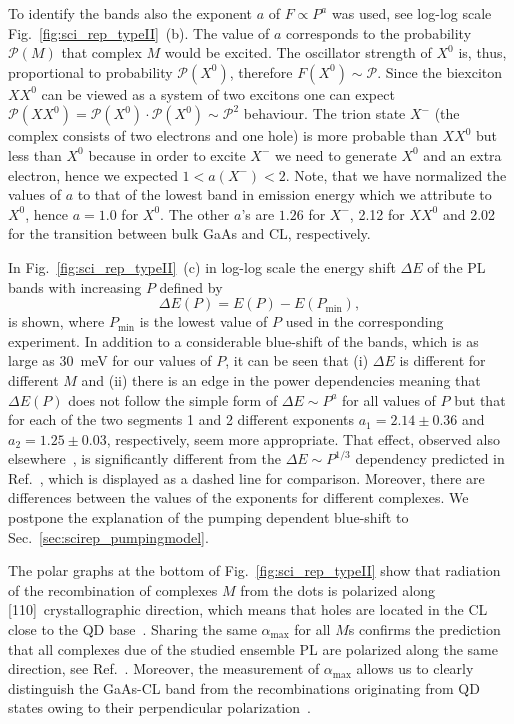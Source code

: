 To identify the bands also the exponent $a$ of $F\propto P^a$ was used, see log-log scale Fig.~\ref{fig:sci_rep_typeII}~(b). The value of $a$ corresponds to the probability $\mathcal{P}(M)$ that complex $M$ would be excited. The oscillator strength of $X^0$ is, thus, proportional to probability $\mathcal{P}(X^0)$, therefore $F(X^0)\sim \mathcal{P}$. Since the biexciton $XX^0$ can be viewed as a system of two excitons one can expect $\mathcal{P}(XX^0)=\mathcal{P}(X^0)\cdot \mathcal{P}(X^0)\sim \mathcal{P}^2$ behaviour. The trion state $X^-$ (the complex consists of two electrons and one hole) is more probable than $XX^0$ but less than $X^0$ because in order to excite $X^-$ we need to generate $X^0$ and an extra electron, hence we expected $1<a(X^-)<2$. Note, that we have normalized the values of $a$ to that of the lowest band in emission energy which we attribute to $X^0$, hence $a=1.0$ for $X^0$. The other $a$'s are $1.26$ for $X^-$, 2.12 for $XX^0$ and 2.02 for the transition between bulk GaAs and CL, respectively.


In Fig.~\ref{fig:sci_rep_typeII}~(c) in log-log scale the energy shift $\Delta E$ of the PL bands with increasing $P$ defined by
\begin{equation}
\Delta E(P)= E(P) - E(P_\mathrm{min}),
\end{equation}
is shown, where $P_\mathrm{min}$ is the lowest value of $P$ used in the corresponding experiment. In addition to a considerable blue-shift of the bands, which is as large as 30~meV for our values of $P$, it can be seen that (i) $\Delta E$ is different for different $M$ and (ii) there is an edge in the power dependencies meaning that $\Delta E(P)$ 
does not follow the simple form of $\Delta E\sim P^a$ for all values of $P$ but that for each of the two segments 1 and 2 different exponents $a_1=2.14\pm0.36$ and $a_2=1.25\pm0.03$, respectively, seem more appropriate. That effect, observed also elsewhere~\citep{Muller-Kirsch2001}, is significantly different from the $\Delta E\sim P^{1/3}$ dependency predicted in Ref.~\citep{Hatami1998}, which is displayed as a dashed line for comparison.
Moreover, there are differences between the values of the exponents for different complexes. We postpone the explanation of the pumping dependent blue-shift to Sec.~\ref{sec:scirep_pumpingmodel}.

The polar graphs at the bottom of Fig.~\ref{fig:sci_rep_typeII} show that radiation of the recombination of complexes $M$ from the dots is polarized along [110]~crystallographic direction, which means that holes are located in the CL close to the QD base~\citep{Klenovsky2015}. Sharing the same $\alpha_\mathrm{max}$ for all $M$s confirms the prediction that all complexes due of the studied ensemble PL are polarized along the same direction, see Ref.~\citep{Klenovsky2017}. Moreover, the measurement of $\alpha_\mathrm{max}$ allows us to clearly distinguish the GaAs-CL band from the recombinations originating from QD states owing to their perpendicular polarization~\citep{Alonso-Alvarez2011a}.

